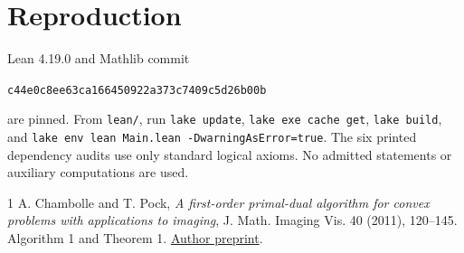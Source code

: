 \documentclass[11pt]{article}
\begin{document}
\section*{Reproduction}
Lean 4.19.0 and Mathlib commit
\begin{center}\small\texttt{c44e0c8ee63ca166450922a373c7409c5d26b00b}\end{center}
are pinned. From \texttt{lean/}, run \texttt{lake update},
\texttt{lake exe cache get}, \texttt{lake build}, and
\texttt{lake env lean Main.lean -DwarningAsError=true}.
The six printed dependency audits use only standard logical axioms.
No admitted statements or auxiliary computations are used.

\begin{thebibliography}{1}
 A. Chambolle and T. Pock,
\emph{A first-order primal-dual algorithm for convex problems with applications to imaging},
J. Math. Imaging Vis. 40 (2011), 120--145. Algorithm 1 and Theorem 1.
\href{https://www.cmap.polytechnique.fr/preprint/repository/685.pdf}{Author preprint}.
\end{thebibliography}
\end{document}
